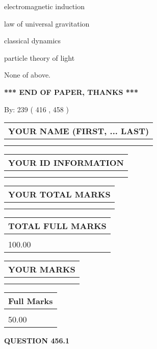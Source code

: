 \documentclass[12pt]{article}
\begin{document}
 
electromagnetic induction
 
 
law of universal gravitation
 
 
classical dynamics
 
 
particle theory of light
 
 
 None of above.
 
 
   
   
\vspace{1.0in} 
{\textbf{\large{ *** END OF PAPER, THANKS *** }}} 
   
   
\hspace{1.0in} By: 
 239 ( 416 ,  458 )
   
   
   
   
\newpage 
\setcounter{page}{ 
   456001 } 
   
   
   
   
\noindent\begin{tabular}{|l|}
\hline
YOUR NAME (FIRST, ... LAST)  \\
\hline
 \\ 
 \\ 
\hline
\end{tabular}
\hspace{0.05in} \begin{tabular}{|l|}
\hline
 YOUR   ID   INFORMATION  \\
\hline
 \\ 
 \\ 
\hline
\end{tabular}
   
   
\vspace{0.2in}\noindent\begin{tabular}{|l|}
\hline
YOUR TOTAL MARKS  \\
\hline
 \\ 
 \\ 
\hline
\end{tabular}
\hspace{0.05in} \begin{tabular}{|l|}
\hline
TOTAL FULL MARKS  \\
\hline
 \\ 
100.00 \\
\hline
\end{tabular}
  
\vspace{0.2in}
  
\noindent\begin{tabular}{|l|}
\hline
 YOUR MARKS  \\
\hline
 \\ 
 \\ 
\hline
\end{tabular}
\hspace{0.05in} \begin{tabular}{|l|}
\hline
 Full Marks  \\
\hline
 \\ 
50.00 \\
\hline
\end{tabular}
{\textbf{\Large{QUESTION
456.1 
}}}
  
\end{document}

